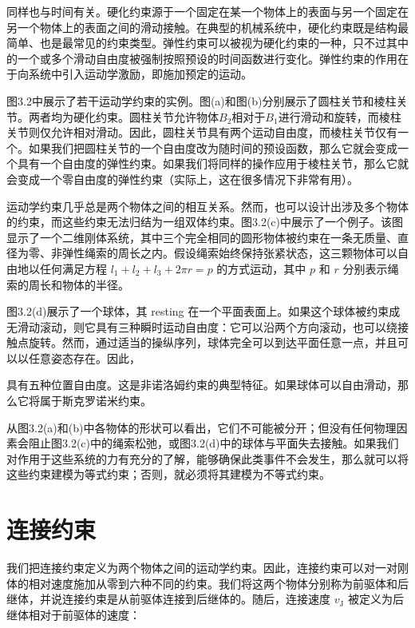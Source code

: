 \documentclass[10pt,a4paper]{book}
\theoremstyle{thmstyle} %
\theoremstyle{defstyle} %
\theoremstyle{prostyle} %
\begin{document}
同样也与时间有关。硬化约束源于一个固定在某一个物体上的表面与另一个固定在另一个物体上的表面之间的滑动接触。在典型的机械系统中，硬化约束既是结构最简单、也是最常见的约束类型。弹性约束可以被视为硬化约束的一种，只不过其中的一个或多个滑动自由度被强制按照预设的时间函数进行变化。弹性约束的作用在于向系统中引入运动学激励，即施加预定的运动。



图3.2中展示了若干运动学约束的实例。图(a)和图(b)分别展示了圆柱关节和棱柱关节。两者均为硬化约束。圆柱关节允许物体$B_{2}$相对于$B_{1}$进行滑动和旋转，而棱柱关节则仅允许相对滑动。因此，圆柱关节具有两个运动自由度，而棱柱关节仅有一个。如果我们把圆柱关节的一个自由度改为随时间的预设函数，那么它就会变成一个具有一个自由度的弹性约束。如果我们将同样的操作应用于棱柱关节，那么它就会变成一个零自由度的弹性约束（实际上，这在很多情况下非常有用）。



运动学约束几乎总是两个物体之间的相互关系。然而，也可以设计出涉及多个物体的约束，而这些约束无法归结为一组双体约束。图3.2(c)中展示了一个例子。该图显示了一个二维刚体系统，其中三个完全相同的圆形物体被约束在一条无质量、直径为零、非弹性绳索的周长之内。假设绳索始终保持张紧状态，这三颗物体可以自由地以任何满足方程 $l_{1} + l_{2} + l_{3} + 2\pi r = p$ 的方式运动，其中 $p$ 和 $r$ 分别表示绳索的周长和物体的半径。



图3.2(d)展示了一个球体，其 resting 在一个平面表面上。如果这个球体被约束成无滑动滚动，则它具有三种瞬时运动自由度：它可以沿两个方向滚动，也可以绕接触点旋转。然而，通过适当的操纵序列，球体完全可以到达平面任意一点，并且可以以任意姿态存在。因此，



具有五种位置自由度。这是非诺洛姆约束的典型特征。如果球体可以自由滑动，那么它将属于斯克罗诺米约束。



从图3.2(a)和(b)中各物体的形状可以看出，它们不可能被分开；但没有任何物理因素会阻止图3.2(c)中的绳索松弛，或图3.2(d)中的球体与平面失去接触。如果我们对作用于这些系统的力有充分的了解，能够确保此类事件不会发生，那么就可以将这些约束建模为等式约束；否则，就必须将其建模为不等式约束。



\section{连接约束}





我们把连接约束定义为两个物体之间的运动学约束。因此，连接约束可以对一对刚体的相对速度施加从零到六种不同的约束。我们将这两个物体分别称为前驱体和后继体，并说连接约束是从前驱体连接到后继体的。随后，连接速度 $v_{\mathrm{J}}$ 被定义为后继体相对于前驱体的速度：
\end{document}
